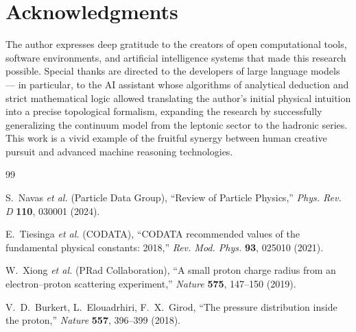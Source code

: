 \documentclass[12pt,a4paper]{article}
\begin{document}
	\section*{Acknowledgments}
	The author expresses deep gratitude to the creators of open computational tools, software environments, and artificial intelligence systems that made this research possible. Special thanks are directed to the developers of large language models --- in particular, to the AI assistant whose algorithms of analytical deduction and strict mathematical logic allowed translating the author's initial physical intuition into a precise topological formalism, expanding the research by successfully generalizing the continuum model from the leptonic sector to the hadronic series. This work is a vivid example of the fruitful synergy between human creative pursuit and advanced machine reasoning technologies.
	
	\begin{thebibliography}{99}
		
		S.~Navas \textit{et al.} (Particle Data Group), ``Review of Particle Physics,'' \textit{Phys. Rev. D} \textbf{110}, 030001 (2024).
		
		E.~Tiesinga \textit{et al.} (CODATA), ``CODATA recommended values of the fundamental physical constants: 2018,'' \textit{Rev. Mod. Phys.} \textbf{93}, 025010 (2021).
		
		W.~Xiong \textit{et al.} (PRad Collaboration), ``A small proton charge radius from an electron–proton scattering experiment,'' \textit{Nature} \textbf{575}, 147--150 (2019).
		
		V.~D.~Burkert, L.~Elouadrhiri, F.~X.~Girod, ``The pressure distribution inside the proton,'' \textit{Nature} \textbf{557}, 396--399 (2018).
		
	\end{thebibliography}
	
\end{document}
